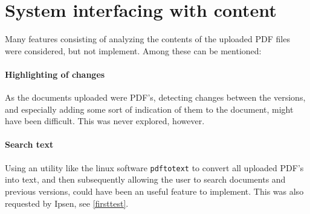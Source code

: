 \documentclass[../../master.tex]{subfiles}
\begin{document}
\section{System interfacing with content}
Many features consisting of analyzing the contents of the uploaded PDF files were considered, but not implement. Among these can be mentioned:

\paragraph{Highlighting of changes}
As the documents uploaded were PDF's, detecting changes between the versions, and especially adding some sort of indication of them to the document, might have been difficult.
This was never explored, however.

\paragraph{Search text}
Using an utility like the linux software \texttt{pdftotext} to convert all uploaded PDF's into text, and then subsequently allowing the user to search documents and previous versions, could have been an useful feature to implement.
This was also requested by Ipsen, see \cref{firsttest}.
\end{document}

